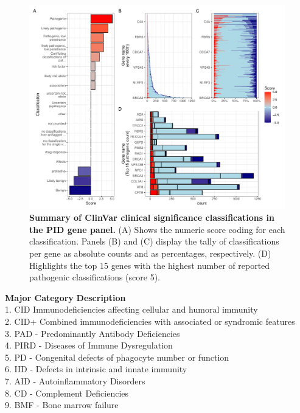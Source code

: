 \begin{figure}[ht]
  \centering
  \includegraphics[width=0.99\textwidth]{../images/p_varRisEst_summary_scores.pdf}
  \caption{\textbf{Summary of ClinVar clinical significance classifications in the PID gene panel.} (A) Shows the numeric score coding for each classification. Panels (B) and (C) display the tally of classifications per gene as absolute counts and as percentages, respectively. (D) Highlights the top 15 genes with the highest number of reported pathogenic classifications (score 5).}
  \label{fig:p_varRisEst_summary_scores}
\end{figure}

\begin{tcolorbox}[colback=black!01, colframe=black!70, title=Box \ref{box:definitions} Definitions for IEI Major Disease Categories, label=box:definitions]
\textbf{Major Category} \hspace{4em} \textbf{Description}\\[5pt]
1. CID  Immunodeficiencies affecting cellular and humoral immunity\\[2pt]
2. CID+  Combined immunodeficiencies with associated or syndromic features\\[2pt]
3. PAD - Predominantly Antibody Deficiencies\\[2pt]
4. PIRD - Diseases of Immune Dysregulation\\[2pt]
5. PD - Congenital defects of phagocyte number or function\\[2pt]
6. IID - Defects in intrinsic and innate immunity\\[2pt]
7. AID - Autoinflammatory Disorders\\[2pt]
8. CD - Complement Deficiencies\\[2pt]
9. BMF - Bone marrow failure
\end{tcolorbox}




